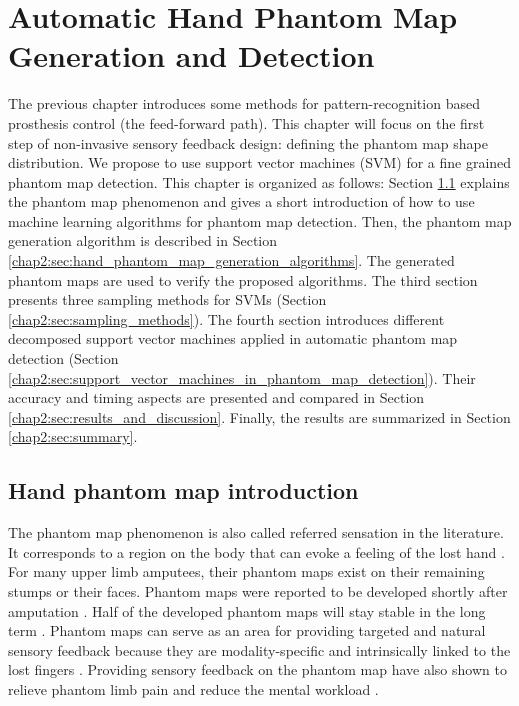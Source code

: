 \chapter{Automatic Hand Phantom Map Generation and Detection}
\label{chap_automatic_hand_phantom_map_generation_detection}
The previous chapter introduces some methods for pattern-recognition based prosthesis control (the feed-forward path). 
This chapter will focus on the first step of non-invasive sensory feedback design: defining the phantom map shape distribution. We propose to use support vector machines (SVM) for a fine grained phantom map detection. This chapter is organized as follows:  
Section \ref{chap2:sec:hand_phantom_map_introduction} explains the phantom map phenomenon and gives a short introduction of how to use machine learning algorithms for phantom map detection.
Then, the phantom map generation algorithm is described in Section \ref{chap2:sec:hand_phantom_map_generation_algorithms}. The generated phantom maps are used to verify the proposed algorithms. 
The third section presents three sampling methods for SVMs (Section \ref{chap2:sec:sampling_methods}). 
The fourth section introduces different decomposed support vector machines applied in automatic phantom map detection (Section \ref{chap2:sec:support_vector_machines_in_phantom_map_detection}). 
Their accuracy and timing aspects are presented and compared in Section \ref{chap2:sec:results_and_discussion}. 
Finally, the results are summarized in Section \ref{chap2:sec:summary}. 

\section{Hand phantom map introduction}
\label{chap2:sec:hand_phantom_map_introduction}
The phantom map phenomenon is also called referred sensation in the literature. It corresponds to a region on the body that can evoke a feeling of the lost hand \cite{bjorkman2012phantom, halligan1993thumb}. For many upper limb amputees, their phantom maps exist on their remaining stumps or their faces. Phantom maps were reported to be developed shortly after amputation \cite{ramachandran1998perception, woodhouse2005phantom, kooijman2000phantom, carlen1978phantom}. Half of the developed phantom maps will stay stable in the long term \cite{ramachandran1998perception}. Phantom maps can serve as an area for providing targeted and natural sensory feedback because they are modality-specific and intrinsically linked to the lost fingers \cite{zhang2015somatotopical, antfolk2013artificial, antfolk2012sensory}. Providing sensory feedback on the phantom map have also shown to relieve phantom limb pain \cite{dietrich2012sensory} and reduce the mental workload \cite{zhang2015somatotopical}. 


